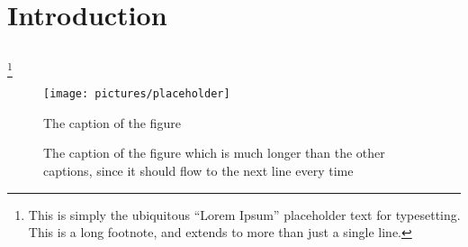 \documentclass[12pt, oneside]{report}
\begin{document}
\frontmatter

\maketitle
\makesignatures
\makecopyright

\unpacklipsum[1-3]
\makeabstract{\lipsumexp}


\tableofcontents

\listoftables

\listoffigures





\mainmatter %

\chapter{Introduction}
\lipsum[1]
\section{\lipsum[150][1-3]}
\lipsum[3]%
\footnote{This is simply the ubiquitous ``Lorem Ipsum'' placeholder text for typesetting. This is a long footnote, and extends to more than just a single line.}

\begin{figure}[h]
  \centering
  \texttt{[image: pictures/placeholder]}
  \caption{The caption of the figure}
  \label{fig:BlockDiagram1}
\end{figure}
  
\begin{figure}[h]
  \centering
  \caption{The caption of the figure which is much longer than the other captions, since it should flow to the next line every time}
  \label{fig:BlockDiagram2}
\end{figure}
\end{document}
